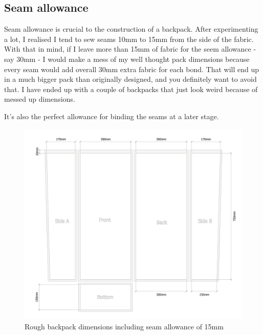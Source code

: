 \subsection{Seam allowance}

Seam allowance is crucial to the construction of a backpack. After experimenting a lot, I realised I tend to sew seams 10mm to 15mm from the side of the fabric. With that in mind, if I leave more than 15mm of fabric for the seem allowance - say 30mm - I would make a mess of my well thought pack dimensions because every seam would add overall 30mm extra fabric for each bond. That will end up in a much bigger pack than originally designed, and you definitely want to avoid that. I have ended up with a couple of backpacks that just look weird because of messed up dimensions.

It's also the perfect allowance for binding the seams at a later stage.

\begin{figure}[H]
  \includegraphics[width=\textwidth]{media/sketches/pack-rough-cut}
  \caption{Rough backpack dimensions including seam allowance of 15mm}
  \label{img:gear-database}
\end{figure}
